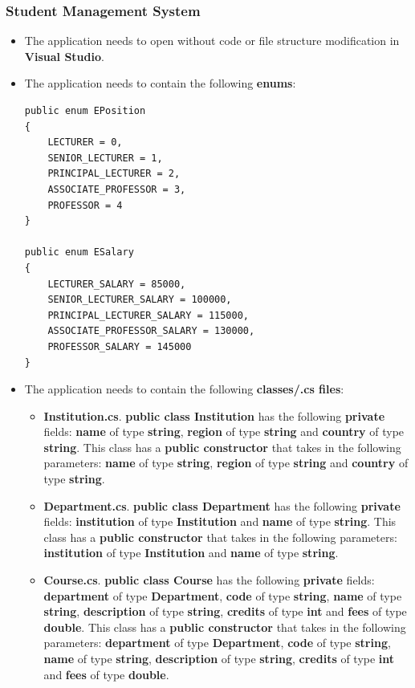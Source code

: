 \documentclass{article}
\begin{document}
\subsubsection*{Student Management System}
\begin{itemize} 
    \item The application needs to open without code or file structure modification in \textbf{Visual Studio}.
    \item The application needs to contain the following \textbf{enums}:
    \begin{verbatim}
public enum EPosition
{
    LECTURER = 0,
    SENIOR_LECTURER = 1,
    PRINCIPAL_LECTURER = 2,
    ASSOCIATE_PROFESSOR = 3,
    PROFESSOR = 4
}
            
public enum ESalary
{
    LECTURER_SALARY = 85000,
    SENIOR_LECTURER_SALARY = 100000,
    PRINCIPAL_LECTURER_SALARY = 115000,
    ASSOCIATE_PROFESSOR_SALARY = 130000,
    PROFESSOR_SALARY = 145000
}
    \end{verbatim}
    \item The application needs to contain the following \textbf{classes/.cs files}:
    \begin{itemize}
        \item \textbf{Institution.cs}. \textbf{public class Institution} has the following \textbf{private} fields: \textbf{name} of type \textbf{string}, \textbf{region} of type \textbf{string} and \textbf{country} of type \textbf{string}. This class has a \textbf{public constructor} that takes in the following parameters: \textbf{name} of type \textbf{string}, \textbf{region} of type \textbf{string} and \textbf{country} of type \textbf{string}. 
        \item \textbf{Department.cs}. \textbf{public class Department} has the following \textbf{private} fields: \textbf{institution} of type \textbf{Institution} and \textbf{name} of type \textbf{string}. This class has a \textbf{public constructor} that takes in the following parameters: \textbf{institution} of type \textbf{Institution} and \textbf{name} of type \textbf{string}.
        \item \textbf{Course.cs}. \textbf{public class Course} has the following \textbf{private} fields: \textbf{department} of type \textbf{Department}, \textbf{code} of type \textbf{string}, \textbf{name} of type \textbf{string}, \textbf{description} of type \textbf{string}, \textbf{credits} of type \textbf{int} and \textbf{fees} of type \textbf{double}. This class has a \textbf{public constructor} that takes in the following parameters: \textbf{department} of type \textbf{Department}, \textbf{code} of type \textbf{string}, \textbf{name} of type \textbf{string}, \textbf{description} of type \textbf{string}, \textbf{credits} of type \textbf{int} and \textbf{fees} of type \textbf{double}.

\end{itemize}
\end{itemize}
\end{document}
